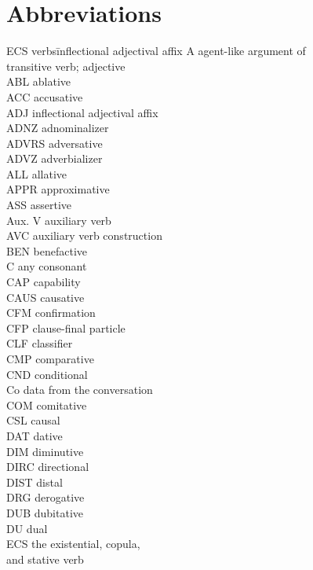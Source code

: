 \section*{Abbreviations}\enlargethispage{\baselineskip}
\begin{multicols}{2}
\begin{tabbing}
ECS verbs\=inflectional adjectival affix\kill
A \>  agent-like argument of \\ \> transitive verb; adjective \\
ABL \>  ablative \\
ACC \>  accusative \\
ADJ \>  inflectional adjectival affix \\
ADNZ \>  adnominalizer \\
ADVRS \>  adversative \\
ADVZ \>  adverbializer \\
ALL \>  allative \\
APPR \>  approximative \\
ASS \>  assertive \\
Aux. V \>  auxiliary verb \\
AVC \>  auxiliary verb construction \\
BEN \>  benefactive \\
C \>  any consonant \\
CAP \>  capability \\
CAUS \>  causative \\
CFM \>  confirmation \\
CFP \>  clause-final particle \\
CLF \>  classifier \\
CMP \>  comparative \\
CND \>  conditional \\
Co \>  data from the conversation \\
COM \>  comitative \\
CSL \>  causal \\
DAT \>  dative \\
DIM \>  diminutive \\
DIRC \>  directional \\
DIST \>  distal \\
DRG \>  derogative \\
DUB \>  dubitative \\
DU \>  dual \\
ECS \>  the existential, copula, \\ \> and stative verb \\

\end{tabbing}
\end{multicols}

